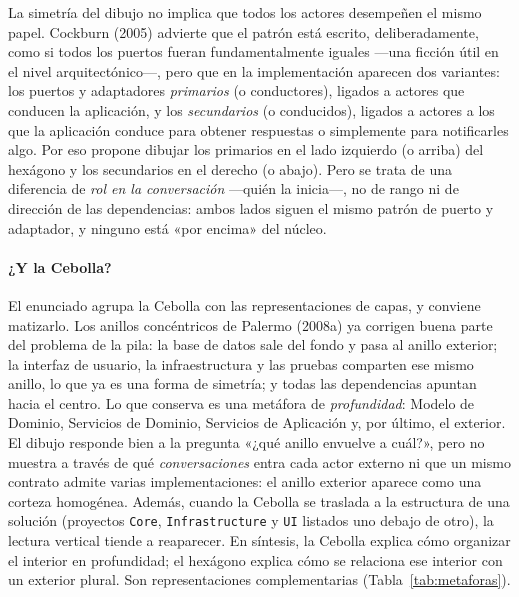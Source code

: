 \documentclass[11pt,a4paper]{article}
\begin{document}
La simetría del dibujo no implica que todos los actores desempeñen el mismo papel. Cockburn
(2005) advierte que el patrón está escrito, deliberadamente, como si todos los puertos fueran
fundamentalmente iguales ---una ficción útil en el nivel arquitectónico---, pero que en la
implementación aparecen dos variantes: los puertos y adaptadores \emph{primarios} (o
conductores), ligados a actores que conducen la aplicación, y los \emph{secundarios} (o
conducidos), ligados a actores a los que la aplicación conduce para obtener respuestas o
simplemente para notificarles algo. Por eso propone dibujar los primarios en el lado izquierdo
(o arriba) del hexágono y los secundarios en el derecho (o abajo). Pero se trata de una
diferencia de \emph{rol en la conversación} ---quién la inicia---, no de rango ni de dirección
de las dependencias: ambos lados siguen el mismo patrón de puerto y adaptador, y ninguno está
«por encima» del núcleo.

\paragraph{¿Y la Cebolla?}
El enunciado agrupa la Cebolla con las representaciones de capas, y conviene matizarlo. Los
anillos concéntricos de Palermo (2008a) ya corrigen buena parte del problema de la pila: la
base de datos sale del fondo y pasa al anillo exterior; la interfaz de usuario, la
infraestructura y las pruebas comparten ese mismo anillo, lo que ya es una forma de simetría;
y todas las dependencias apuntan hacia el centro. Lo que conserva es una metáfora de
\emph{profundidad}: Modelo de Dominio, Servicios de Dominio, Servicios de Aplicación y, por
último, el exterior. El dibujo responde bien a la pregunta «¿qué anillo envuelve a cuál?»,
pero no muestra a través de qué \emph{conversaciones} entra cada actor externo ni que un mismo
contrato admite varias implementaciones: el anillo exterior aparece como una corteza
homogénea. Además, cuando la Cebolla se traslada a la estructura de una solución (proyectos
\texttt{Core}, \texttt{Infrastructure} y \texttt{UI} listados uno debajo de otro), la lectura
vertical tiende a reaparecer. En síntesis, la Cebolla explica cómo organizar el interior en
profundidad; el hexágono explica cómo se relaciona ese interior con un exterior plural. Son
representaciones complementarias (Tabla~\ref{tab:metaforas}).
\end{document}

